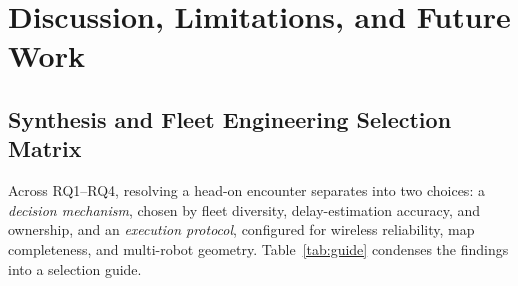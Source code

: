\section{Discussion, Limitations, and Future Work}\label{sec:disc}


\subsection{Synthesis and Fleet Engineering Selection Matrix}
Across RQ1--RQ4, resolving a head-on encounter separates into two choices: a \emph{decision mechanism}, chosen by fleet diversity, delay-estimation accuracy, and ownership, and an \emph{execution protocol}, configured for wireless reliability, map completeness, and multi-robot geometry. Table~\ref{tab:guide} condenses the findings into a selection guide.

